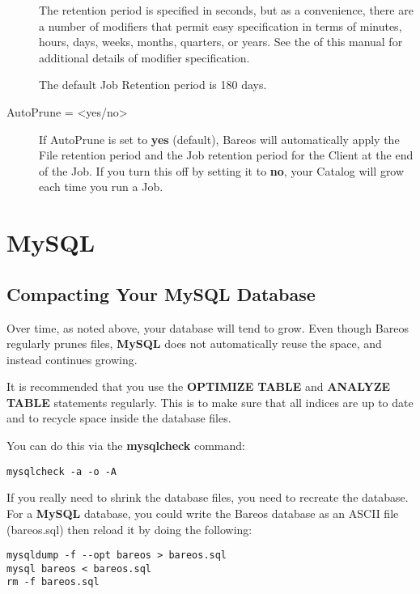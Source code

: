 \begin{description}
The retention period is specified in seconds, but as a convenience, there
are a number of modifiers that permit easy specification in terms of
minutes, hours, days, weeks, months, quarters, or years.  See the  of this manual for additional details of
modifier specification.

The default Job Retention period is 180 days.

\item [AutoPrune = {\textless}yes/no{\textgreater}]
   If AutoPrune is set to  {\bf yes} (default), Bareos will  automatically apply
the File retention period and the Job  retention period for the Client at the
end of the Job.
If you turn this off by setting it to {\bf no}, your  Catalog will grow each
time you run a Job.
\end{description}

\section{MySQL}
\label{CompactingMySQL}
\subsection{Compacting Your MySQL Database}


Over time, as noted above, your database will tend to grow.
Even though Bareos regularly prunes files, {\bf MySQL} does not automatically
reuse the space, and instead continues growing.

It is recommended that you use the {\bf OPTIMIZE TABLE} and {\bf ANALYZE TABLE}
statements regularly. This is to make sure that all indices are up to date
and to recycle space inside the database files.

You can do this via the {\bf mysqlcheck} command:
\footnotesize
\begin{verbatim}
mysqlcheck -a -o -A
\end{verbatim}
\normalsize

If you really need to shrink the database files, you need to recreate the database.
For a {\bf MySQL} database, you could write the Bareos database as an ASCII
file (bareos.sql) then reload it by doing the following:

\footnotesize
\begin{verbatim}
mysqldump -f --opt bareos > bareos.sql
mysql bareos < bareos.sql
rm -f bareos.sql
\end{verbatim}
\normalsize

